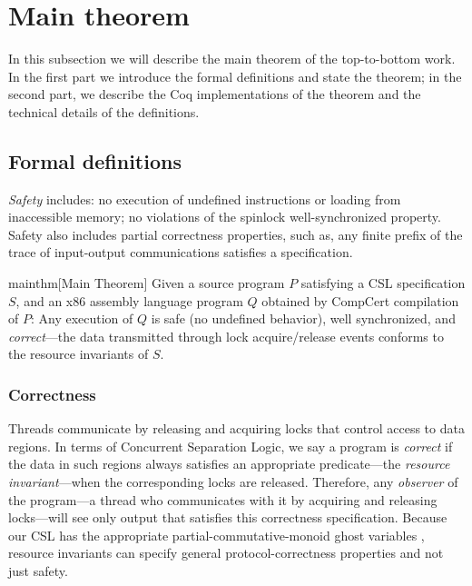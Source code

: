 \section{Main theorem}
\label{sec:topbottom:theorem}


In this subsection we will describe the main theorem of the top-to-bottom work. In the first part we introduce the formal definitions and state the theorem; in the second part, we describe the Coq implementations of the theorem and the technical details of the definitions. 

\subsection{Formal definitions}\label{sec:topbottomdefs}

\emph{Safety} includes: no execution of undefined instructions or loading from inaccessible memory; no violations of the spinlock well-synchronized property. Safety also includes partial correctness properties, such as, any finite prefix of the trace of input-output communications satisfies a specification.

\begin{reptheorem}{mainthm}[Main Theorem]\hypertarget{mainthm-formal}{
Given a source program $P$ satisfying a CSL specification $S$, and an
x86 assembly language program $Q$ obtained by CompCert compilation of
$P$: Any execution of $Q$ is safe (no undefined behavior), well
synchronized, and \emph{correct}---the data transmitted through lock
acquire/release events conforms to the resource invariants of $S$.}
\end{reptheorem}


\subsubsection{Correctness}

Threads communicate
by releasing and acquiring locks that control access to
data regions.  In terms of Concurrent Separation Logic, we say
a program is \emph{correct} if
the data in such regions always
satisfies an appropriate predicate---the \emph{resource invariant}---when
the corresponding
locks are released.
Therefore, any \emph{observer} of the program---a thread who communicates with
it by acquiring and releasing locks---will see only output
that satisfies this correctness specification.
Because our CSL has the appropriate partial-commutative-monoid ghost variables
\cite{jung2015iris}, resource invariants
can specify general protocol-correctness properties
and not just safety.

